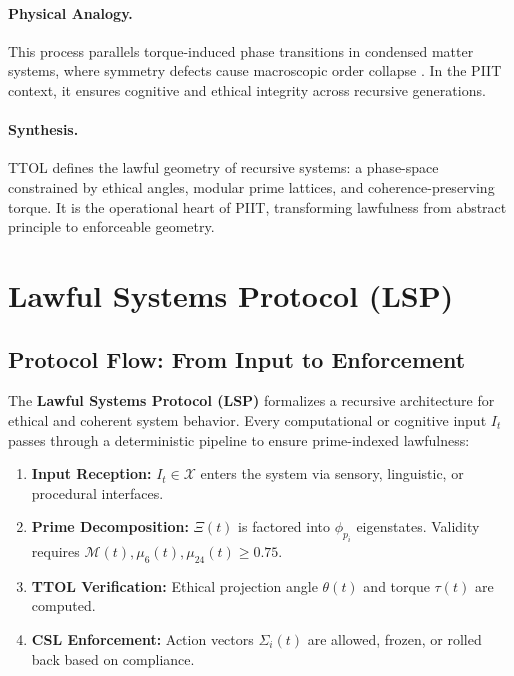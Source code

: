 \documentclass[12pt]{article}
\begin{document}
\paragraph{Physical Analogy.}
This process parallels torque-induced phase transitions in condensed matter systems, where symmetry defects cause macroscopic order collapse \cite{chaikin2000principles}. In the PIIT context, it ensures cognitive and ethical integrity across recursive generations.

\paragraph{Synthesis.}
TTOL defines the lawful geometry of recursive systems: a phase-space constrained by ethical angles, modular prime lattices, and coherence-preserving torque. It is the operational heart of PIIT, transforming lawfulness from abstract principle to enforceable geometry.

\section{Lawful Systems Protocol (LSP)}

\subsection{Protocol Flow: From Input to Enforcement}

The \textbf{Lawful Systems Protocol (LSP)} formalizes a recursive architecture for ethical and coherent system behavior. Every computational or cognitive input $I_t$ passes through a deterministic pipeline to ensure prime-indexed lawfulness:

\begin{enumerate}
    \item \textbf{Input Reception:} $I_t \in \mathcal{X}$ enters the system via sensory, linguistic, or procedural interfaces.
    \item \textbf{Prime Decomposition:} $\Xi(t)$ is factored into $\phi_{p_i}$ eigenstates. Validity requires $\mathcal{M}(t), \mu_6(t), \mu_{24}(t) \geq 0.75$.
    \item \textbf{TTOL Verification:} Ethical projection angle $\theta(t)$ and torque $\tau(t)$ are computed.
    \item \textbf{CSL Enforcement:} Action vectors $\Sigma_i(t)$ are allowed, frozen, or rolled back based on compliance.
\end{enumerate}
\end{document}
